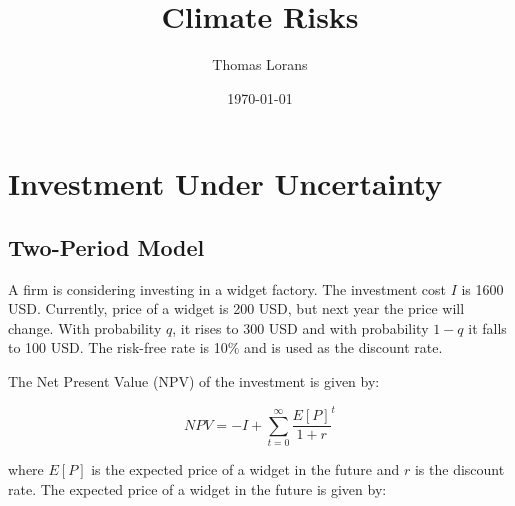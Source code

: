 \documentclass{article}
\title{Climate Risks}
\author{Thomas Lorans}
\date{\today}
\begin{document}
\maketitle

\begin{abstract}
 
\end{abstract}


\section{Investment Under Uncertainty}

\subsection{Two-Period Model}

A firm is considering investing 
in a widget factory. The investment 
cost $I$ is 1600 USD. 
Currently, price of a widget is 200 USD, but next year the price will change.
With probability $q$, it rises to 300 USD and with probability $1-q$ it falls to 100 USD.
The risk-free rate is 10\% and is used as the discount rate.



The Net Present Value (NPV) of the investment is given by:

\begin{equation}
    NPV = - I + \sum^{\infty}_{t=0} \frac{E[P]}{1 + r}^t
\end{equation}

where $E[P]$ is the expected price of a widget in the future and $r$ is the discount rate.
The expected price of a widget in the future is given by:
\end{document}

